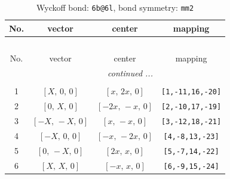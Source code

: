 \documentclass[fleqn,8pt]{jsarticle}
\begin{document}
\begin{longtable}{cccc}
\caption{Wyckoff bond: {\tt 6b@6l}, bond symmetry: {\tt mm2}}
 \\
 \hline \hline
No. & vector & center & mapping \\ \hline \endfirsthead

\multicolumn{3}{l}{\tablename\ \thetable{}} \\
 \hline \hline
No. & vector & center & mapping \\ \hline \endhead

 \hline \hline
\multicolumn{3}{r}{\footnotesize\it continued ...} \\ \endfoot

 \hline \hline
\multicolumn{3}{r}{} \\ \endlastfoot

1 & $\left[ X,\, 0,\, 0 \right]$ & $\left[ x,\, 2 x,\, 0 \right]$ & {\tt [1,-11,16,-20]} \\ \hline
2 & $\left[ 0,\, X,\, 0 \right]$ & $\left[ - 2 x,\, - x,\, 0 \right]$ & {\tt [2,-10,17,-19]} \\ \hline
3 & $\left[ - X,\, - X,\, 0 \right]$ & $\left[ x,\, - x,\, 0 \right]$ & {\tt [3,-12,18,-21]} \\ \hline
4 & $\left[ - X,\, 0,\, 0 \right]$ & $\left[ - x,\, - 2 x,\, 0 \right]$ & {\tt [4,-8,13,-23]} \\ \hline
5 & $\left[ 0,\, - X,\, 0 \right]$ & $\left[ 2 x,\, x,\, 0 \right]$ & {\tt [5,-7,14,-22]} \\ \hline
6 & $\left[ X,\, X,\, 0 \right]$ & $\left[ - x,\, x,\, 0 \right]$ & {\tt [6,-9,15,-24]} \\
\end{longtable}
\renewcommand{\arraystretch}{1.2}
\end{document}
